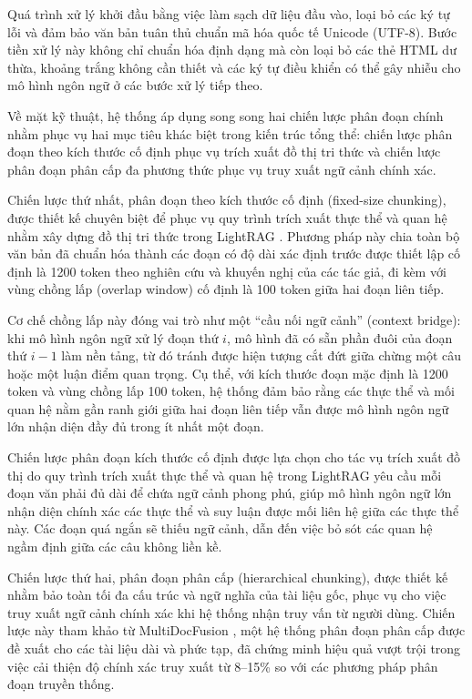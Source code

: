 \indent Quá trình xử lý khởi đầu bằng việc làm sạch dữ liệu đầu vào, loại bỏ các ký tự lỗi và đảm bảo văn bản tuân thủ chuẩn mã hóa quốc tế Unicode (UTF-8). Bước tiền xử lý này không chỉ chuẩn hóa định dạng mà còn loại bỏ các thẻ HTML dư thừa, khoảng trắng không cần thiết và các ký tự điều khiển có thể gây nhiễu cho mô hình ngôn ngữ ở các bước xử lý tiếp theo.

\indent Về mặt kỹ thuật, hệ thống áp dụng song song hai chiến lược phân đoạn chính nhằm phục vụ hai mục tiêu khác biệt trong kiến trúc tổng thể: chiến lược phân đoạn theo kích thước cố định phục vụ trích xuất đồ thị tri thức và chiến lược phân đoạn phân cấp đa phương thức phục vụ truy xuất ngữ cảnh chính xác.

\indent Chiến lược thứ nhất, phân đoạn theo kích thước cố định (fixed-size chunking), được thiết kế chuyên biệt để phục vụ quy trình trích xuất thực thể và quan hệ nhằm xây dựng đồ thị tri thức trong LightRAG \cite{lightrag}. Phương pháp này chia toàn bộ văn bản đã chuẩn hóa thành các đoạn có độ dài xác định trước được thiết lập cố định là 1200 token theo nghiên cứu và khuyến nghị của các tác giả, đi kèm với vùng chồng lấp (overlap window) cố định là 100 token giữa hai đoạn liên tiếp.

\indent Cơ chế chồng lấp này đóng vai trò như một ``cầu nối ngữ cảnh'' (context bridge): khi mô hình ngôn ngữ xử lý đoạn thứ $i$, mô hình đã có sẵn phần đuôi của đoạn thứ $i-1$ làm nền tảng, từ đó tránh được hiện tượng cắt đứt giữa chừng một câu hoặc một luận điểm quan trọng. Cụ thể, với kích thước đoạn mặc định là 1200 token và vùng chồng lấp 100 token, hệ thống đảm bảo rằng các thực thể và mối quan hệ nằm gần ranh giới giữa hai đoạn liên tiếp vẫn được mô hình ngôn ngữ lớn nhận diện đầy đủ trong ít nhất một đoạn.

\indent Chiến lược phân đoạn kích thước cố định được lựa chọn cho tác vụ trích xuất đồ thị do quy trình trích xuất thực thể và quan hệ trong LightRAG yêu cầu mỗi đoạn văn phải đủ dài để chứa ngữ cảnh phong phú, giúp mô hình ngôn ngữ lớn nhận diện chính xác các thực thể và suy luận được mối liên hệ giữa các thực thể này. Các đoạn quá ngắn sẽ thiếu ngữ cảnh, dẫn đến việc bỏ sót các quan hệ ngầm định giữa các câu không liền kề.

\indent Chiến lược thứ hai, phân đoạn phân cấp (hierarchical chunking), được thiết kế nhằm bảo toàn tối đa cấu trúc và ngữ nghĩa của tài liệu gốc, phục vụ cho việc truy xuất ngữ cảnh chính xác khi hệ thống nhận truy vấn từ người dùng. Chiến lược này tham khảo từ MultiDocFusion \cite{shin-etal-2025-multidocfusion}, một hệ thống phân đoạn phân cấp được đề xuất cho các tài liệu dài và phức tạp, đã chứng minh hiệu quả vượt trội trong việc cải thiện độ chính xác truy xuất từ 8--15\% so với các phương pháp phân đoạn truyền thống.

